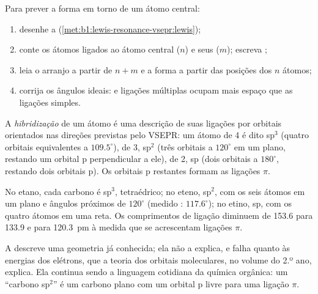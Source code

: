 \begin{method}\label{met:b1:lewis-resonance-vsepr:vsepr}
Para prever a forma em torno de um átomo central:
\begin{enumerate}
  \item desenhe a  (\cref{met:b1:lewis-resonance-vsepr:lewis});
  \item conte os átomos ligados ao átomo central ($n$) e seus  ($m$); escreva ;
  \item leia o arranjo a partir de $n + m$ e a forma a partir das
        posições dos $n$ átomos;
  \item corrija os ângulos ideais:  e ligações
        múltiplas ocupam mais espaço que as ligações simples.
\end{enumerate}
\end{method}

\begin{definition}[Hibridização]\label{def:b1:lewis-resonance-vsepr:hybridisation}
A \emph{hibridização} de um átomo é uma
descrição de suas ligações por orbitais orientados nas direções
previstas pelo VSEPR: um átomo de  4 é dito sp$^3$
(quatro orbitais equivalentes a $109.5^\circ$), de  3,
sp$^2$ (três orbitais a $120^\circ$ em um plano, restando um orbital p
perpendicular a ele), de  2, sp (dois orbitais a
$180^\circ$, restando dois orbitais p). Os orbitais p restantes formam
as ligações $\pi$.
\end{definition}

\begin{example}\label{ex:b1:lewis-resonance-vsepr:carbon}
No etano, cada carbono é sp$^3$, tetraédrico; no eteno, sp$^2$, com os
seis átomos em um plano e ângulos próximos de $120^\circ$ (medido
: $117.6^\circ$); no etino, sp, com os quatro átomos em uma
reta. Os comprimentos de ligação diminuem de 153.6 para 133.9 e para
\qty{120.3}{pm} à medida que se acrescentam ligações $\pi$.
\end{example}

\begin{remark}\label{rem:b1:lewis-resonance-vsepr:hybrid-limit}
A  descreve uma geometria já conhecida; ela não a explica,
e falha quanto às energias dos elétrons, que a teoria dos orbitais
moleculares, no volume do 2.º ano, explica. Ela continua sendo a
linguagem cotidiana da química orgânica: um ``carbono sp$^2$'' é um
carbono plano com um orbital p livre para uma ligação $\pi$.
\end{remark}

